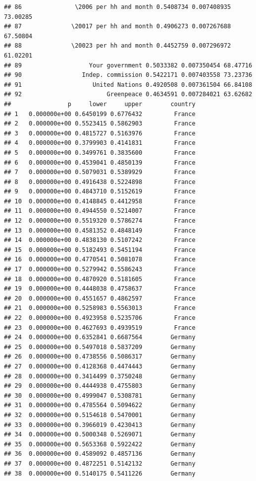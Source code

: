 \documentclass[a4paper,12pt]{article}\usepackage[]{graphicx}\usepackage[]{color}
\makeatletter
\newenvironment{kframe}{%
 \def\at@end@of@kframe{}%
 \ifinner\ifhmode%
  \def\at@end@of@kframe{\end{minipage}}%
  \begin{minipage}{\columnwidth}%
 \fi\fi%
 \def\FrameCommand##1{\hskip\@totalleftmargin \hskip-\fboxsep
 \colorbox{shadecolor}{##1}\hskip-\fboxsep
     \hskip-\linewidth \hskip-\@totalleftmargin \hskip\columnwidth}%
 \MakeFramed {\advance\hsize-\width
   \@totalleftmargin\z@ \linewidth\hsize
   \@setminipage}}%
 {\par\unskip\endMakeFramed%
 \at@end@of@kframe}
\newenvironment{knitrout}{}{} %
\makeatother
\begin{document}
\begin{knitrout}
\begin{kframe}
\begin{verbatim}
## 86               \2006 per hh and month 0.5408734 0.007408935 73.00285
## 87              \20017 per hh and month 0.4906273 0.007267688 67.50804
## 88              \20023 per hh and month 0.4452759 0.007296972 61.02201
## 89                   Your government 0.5033382 0.007350454 68.47716
## 90                 Indep. commission 0.5422171 0.007403558 73.23736
## 91                    United Nations 0.4920508 0.007361504 66.84108
## 92                        Greenpeace 0.4634591 0.007284021 63.62682
##                p     lower     upper        country
## 1   0.000000e+00 0.6450199 0.6776432         France
## 2   0.000000e+00 0.5523415 0.5862903         France
## 3   0.000000e+00 0.4815727 0.5163976         France
## 4   0.000000e+00 0.3799903 0.4141831         France
## 5   0.000000e+00 0.3499761 0.3835600         France
## 6   0.000000e+00 0.4539041 0.4850139         France
## 7   0.000000e+00 0.5079031 0.5389929         France
## 8   0.000000e+00 0.4916438 0.5224898         France
## 9   0.000000e+00 0.4843710 0.5152619         France
## 10  0.000000e+00 0.4148845 0.4412958         France
## 11  0.000000e+00 0.4944550 0.5214007         France
## 12  0.000000e+00 0.5519320 0.5786274         France
## 13  0.000000e+00 0.4581352 0.4848149         France
## 14  0.000000e+00 0.4838130 0.5107242         France
## 15  0.000000e+00 0.5182493 0.5451194         France
## 16  0.000000e+00 0.4770541 0.5081078         France
## 17  0.000000e+00 0.5279942 0.5586243         France
## 18  0.000000e+00 0.4870920 0.5181605         France
## 19  0.000000e+00 0.4448038 0.4758637         France
## 20  0.000000e+00 0.4551657 0.4862597         France
## 21  0.000000e+00 0.5258983 0.5563013         France
## 22  0.000000e+00 0.4923958 0.5235706         France
## 23  0.000000e+00 0.4627693 0.4939519         France
## 24  0.000000e+00 0.6352841 0.6687564        Germany
## 25  0.000000e+00 0.5497018 0.5837209        Germany
## 26  0.000000e+00 0.4738556 0.5086317        Germany
## 27  0.000000e+00 0.4128368 0.4474443        Germany
## 28  0.000000e+00 0.3414499 0.3750248        Germany
## 29  0.000000e+00 0.4444938 0.4755803        Germany
## 30  0.000000e+00 0.4999047 0.5308781        Germany
## 31  0.000000e+00 0.4785564 0.5094622        Germany
## 32  0.000000e+00 0.5154618 0.5470001        Germany
## 33  0.000000e+00 0.3966019 0.4230413        Germany
## 34  0.000000e+00 0.5000348 0.5269071        Germany
## 35  0.000000e+00 0.5653368 0.5922422        Germany
## 36  0.000000e+00 0.4589092 0.4857136        Germany
## 37  0.000000e+00 0.4872251 0.5142132        Germany
## 38  0.000000e+00 0.5140175 0.5411226        Germany

\end{verbatim}
\end{kframe}
\end{knitrout}
\end{document}
